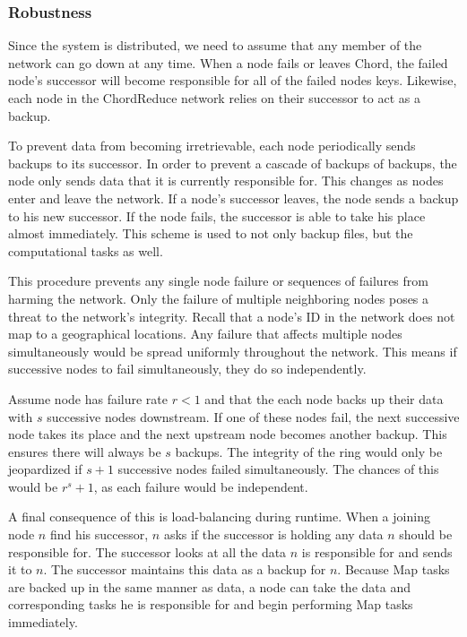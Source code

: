 \subsubsection{Robustness}
Since the system is distributed, we need to assume that any member of the network can go down at any time.
When a node fails or leaves Chord, the failed node's successor will become responsible for all of the failed nodes keys.
Likewise, each node in the ChordReduce network relies on their successor to act as a backup.

To prevent data from becoming irretrievable, each node periodically sends backups to its successor.
In order to prevent a cascade of backups of backups, the node only sends data that it is currently responsible for.
This changes as nodes enter and leave the network.
If a node's successor leaves, the node sends a backup to his new successor.
If the node fails, the successor is able to take his place almost immediately.
This scheme is used to not only backup files, but the computational tasks as well.

This procedure prevents any single node failure or sequences of failures from harming the network.
Only the failure of multiple neighboring nodes poses a threat to the network's integrity.
Recall that a node's ID in the network does not map to a geographical locations.
Any failure that affects multiple nodes simultaneously would be spread uniformly throughout the network.
This means if successive nodes to fail simultaneously, they do so independently.

Assume node has failure rate $r < 1$ and that the each node backs up their data with $s$ successive nodes downstream.
If one of these nodes fail, the next successive node takes its place and the next upstream node becomes another backup.
This ensures there will always be $s$ backups.
The integrity of the ring would only be jeopardized if $s+1$ successive nodes failed simultaneously.
The chances of this would be $r^s+1$, as each failure would be independent.


A final consequence of this is load-balancing during runtime.
When a joining node $n$ find his successor, $n$ asks if the successor is holding any data $n$ should be responsible for.
The successor looks at all the data $n$ is responsible for and sends it to $n$.
The successor maintains this data as a backup for $n$.
Because Map tasks are backed up in the same manner as data, a node can take the data and corresponding tasks he is responsible for and begin performing Map tasks immediately.

